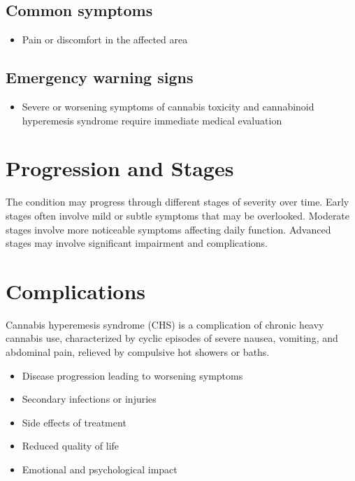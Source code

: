 \subsection{Common symptoms}
\begin{itemize}[noitemsep]
  \item Pain or discomfort in the affected area
  \end{itemize}

\subsection{Emergency warning signs}
\begin{itemize}[noitemsep]
  \item Severe or worsening symptoms of cannabis toxicity and cannabinoid hyperemesis syndrome require immediate medical evaluation
\end{itemize}
\section{Progression and Stages}
The condition may progress through different stages of severity over time. Early stages often involve mild or subtle symptoms that may be overlooked. Moderate stages involve more noticeable symptoms affecting daily function. Advanced stages may involve significant impairment and complications.
\section{Complications}
Cannabis hyperemesis syndrome (CHS) is a complication of chronic heavy cannabis use, characterized by cyclic episodes of severe nausea, vomiting, and abdominal pain, relieved by compulsive hot showers or baths.

\begin{itemize}[noitemsep]
  \item Disease progression leading to worsening symptoms
  \item Secondary infections or injuries
  \item Side effects of treatment
  \item Reduced quality of life
  \item Emotional and psychological impact
\end{itemize}
